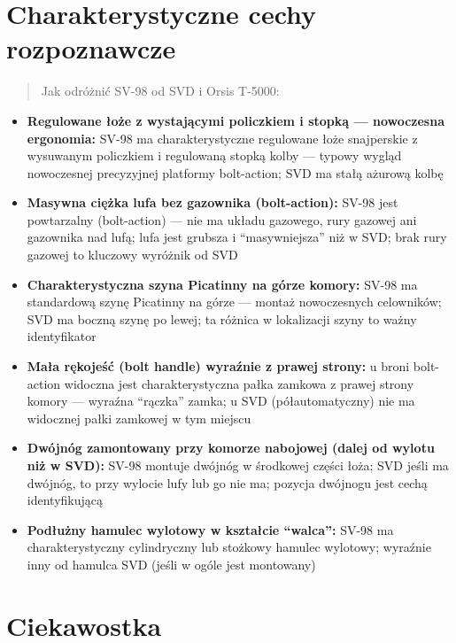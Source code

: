 \documentclass[12pt,openany,oneside]{book}
\providecommand{\tightlist}{%
  \setlength{\itemsep}{0pt}\setlength{\parskip}{0pt}}
\begin{document}
\section{Charakterystyczne cechy
rozpoznawcze}\label{charakterystyczne-cechy-rozpoznawcze-63}

\begin{quote}
Jak odróżnić SV-98 od SVD i Orsis T-5000:
\end{quote}

\begin{itemize}
\tightlist
\item
  \textbf{Regulowane łoże z wystającymi policzkiem i stopką ---
  nowoczesna ergonomia:} SV-98 ma charakterystyczne regulowane łoże
  snajperskie z wysuwanym policzkiem i regulowaną stopką kolby ---
  typowy wygląd nowoczesnej precyzyjnej platformy bolt-action; SVD ma
  stałą ażurową kolbę
\item
  \textbf{Masywna ciężka lufa bez gazownika (bolt-action):} SV-98 jest
  powtarzalny (bolt-action) --- nie ma układu gazowego, rury gazowej ani
  gazownika nad lufą; lufa jest grubsza i ``masywniejsza'' niż w SVD;
  brak rury gazowej to kluczowy wyróżnik od SVD
\item
  \textbf{Charakterystyczna szyna Picatinny na górze komory:} SV-98 ma
  standardową szynę Picatinny na górze --- montaż nowoczesnych
  celowników; SVD ma boczną szynę po lewej; ta różnica w lokalizacji
  szyny to ważny identyfikator
\item
  \textbf{Mała rękojeść (bolt handle) wyraźnie z prawej strony:} u broni
  bolt-action widoczna jest charakterystyczna pałka zamkowa z prawej
  strony komory --- wyraźna ``rączka'' zamka; u SVD (półautomatyczny)
  nie ma widocznej pałki zamkowej w tym miejscu
\item
  \textbf{Dwójnóg zamontowany przy komorze nabojowej (dalej od wylotu
  niż w SVD):} SV-98 montuje dwójnóg w środkowej części łoża; SVD jeśli
  ma dwójnóg, to przy wylocie lufy lub go nie ma; pozycja dwójnogu jest
  cechą identyfikującą
\item
  \textbf{Podłużny hamulec wylotowy w kształcie ``walca'':} SV-98 ma
  charakterystyczny cylindryczny lub stożkowy hamulec wylotowy; wyraźnie
  inny od hamulca SVD (jeśli w ogóle jest montowany)
\end{itemize}

\section{Ciekawostka}\label{ciekawostka-63}
\end{document}
